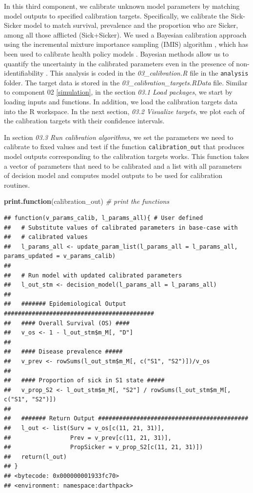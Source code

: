 \documentclass[]{book}
\newenvironment{Shaded}{\begin{snugshade}}{\end{snugshade}}
\newcommand{\CommentTok}[1]{\textcolor[rgb]{0.56,0.35,0.01}{\textit{#1}}}
\newcommand{\KeywordTok}[1]{\textcolor[rgb]{0.13,0.29,0.53}{\textbf{#1}}}
\newcommand{\NormalTok}[1]{#1}
\begin{document}
In this third component, we calibrate unknown model parameters by matching model outputs to specified calibration targets. Specifically, we calibrate the Sick-Sicker model to match survival, prevalence and the proportion who are Sicker, among all those afflicted (Sick+Sicker). We used a Bayesian calibration approach using the incremental mixture importance sampling (IMIS) algorithm \citep{Steele2006}, which has been used to calibrate health policy models \citep[\citet{Menzies2017}, \citet{Rutter2018}]{Raftery2010}. Bayesian methods allow us to quantify the uncertainty in the calibrated parameters even in the presence of non-identifiability \citep{Alarid-Escudero2018b}. This analysis is coded in the \emph{03\_calibration.R} file in the \texttt{analysis} folder. The target data is stored in the \emph{03\_calibration\_targets.RData} file. Similar to component 02 \ref{simulation}, in the section \emph{03.1 Load packages}, we start by loading inputs and functions. In addition, we load the calibration targets data into the R workspace. In the next section, \emph{03.2 Visualize targets}, we plot each of the calibration targets with their confidence intervals.

In section \emph{03.3 Run calibration algorithms}, we set the parameters we need to calibrate to fixed values and test if the function \texttt{calibration\_out} that produces model outputs corresponding to the calibration targets works. This function takes a vector of parameters that need to be calibrated and a list with all parameters of decision model and computes model outputs to be used for calibration routines.

\begin{Shaded}
\begin{Highlighting}[]
\KeywordTok{print.function}\NormalTok{(calibration_out) }\CommentTok{# print the functions}
\end{Highlighting}
\end{Shaded}

\begin{verbatim}
## function(v_params_calib, l_params_all){ # User defined
##   # Substitute values of calibrated parameters in base-case with 
##   # calibrated values
##   l_params_all <- update_param_list(l_params_all = l_params_all, params_updated = v_params_calib)
##   
##   # Run model with updated calibrated parameters
##   l_out_stm <- decision_model(l_params_all = l_params_all)
##   
##   ####### Epidemiological Output ###########################################
##   #### Overall Survival (OS) ####
##   v_os <- 1 - l_out_stm$m_M[, "D"]
##   
##   #### Disease prevalence #####
##   v_prev <- rowSums(l_out_stm$m_M[, c("S1", "S2")])/v_os
##   
##   #### Proportion of sick in S1 state #####
##   v_prop_S2 <- l_out_stm$m_M[, "S2"] / rowSums(l_out_stm$m_M[, c("S1", "S2")])
##   
##   ####### Return Output ###########################################
##   l_out <- list(Surv = v_os[c(11, 21, 31)],
##                 Prev = v_prev[c(11, 21, 31)],
##                 PropSicker = v_prop_S2[c(11, 21, 31)])
##   return(l_out)
## }
## <bytecode: 0x000000001933fc70>
## <environment: namespace:darthpack>
\end{verbatim}
\end{document}
